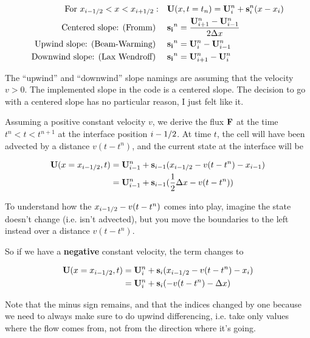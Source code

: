 \begin{align*}
	\text{For } x_{i-1/2} < x < x_{i+1/2}: &&
	& \mathbf{U}(x, t=t_n) = \mathbf{U}_i^n + \mathbf{s}_i^n(x - x_i) \\
	\text{Centered slope: (Fromm) } && &\mathbf{s_i}^n = \frac{\mathbf{U}_{i+1}^n - \mathbf{U}_{i-1}^n}{ 2 \Delta x}\\
	\text{Upwind slope: (Beam-Warming) } && &\mathbf{s_i}^n = \mathbf{U}_{i}^n - \mathbf{U}_{i-1}^n \\
	\text{Downwind slope: (Lax Wendroff) } && &\mathbf{s_i}^n = \mathbf{U}_{i+1}^n - \mathbf{U}_{i}^n \\
\end{align*}

The ``upwind'' and ``downwind'' slope namings are assuming that the velocity $v > 0$.
The implemented slope in the code is a centered slope.
The decision to go with a centered slope has no particular reason, I just felt like it.



Assuming a positive constant velocity $v$, we derive the flux $\mathbf{F}$ at the time $t^n < t < t^{n+1}$ at the interface position $i-1/2$.
At time $t$, the cell will have been advected by a distance $v (t - t^n)$, and the current state at the interface will be

\begin{align*}
	\mathbf{U}(x=x_{i-1/2}, t) 
		&= \mathbf{U}_{i-1}^n + \mathbf{s}_{i-1} (x_{i-1/2} - v (t - t^n) - x_{i-1}) \\
		&= \mathbf{U}_{i-1}^n + \mathbf{s}_{i-1} (\frac{1}{2} \Delta x - v (t - t^n))
\end{align*}

To understand how the $x_{i-1/2} - v (t - t^n)$ comes into play, imagine the state doesn't change (i.e. isn't advected), but you move the boundaries to the left instead over a distance $v(t - t^n)$.

So if we have a \textbf{negative} constant velocity, the term changes to 

\begin{align*}
	\mathbf{U}(x=x_{i-1/2}, t) 
		&= \mathbf{U}_{i}^n + \mathbf{s}_{i} (x_{i-1/2} - v (t - t^n) - x_{i}) \\
		&= \mathbf{U}_{i}^n + \mathbf{s}_{i} (-v (t - t^n) - \Delta x)
\end{align*}



Note that the minus sign remains, and that the indices changed by one because we need to always make sure to do upwind differencing, i.e. take only values where the flow comes from, not from the direction where it's going.

